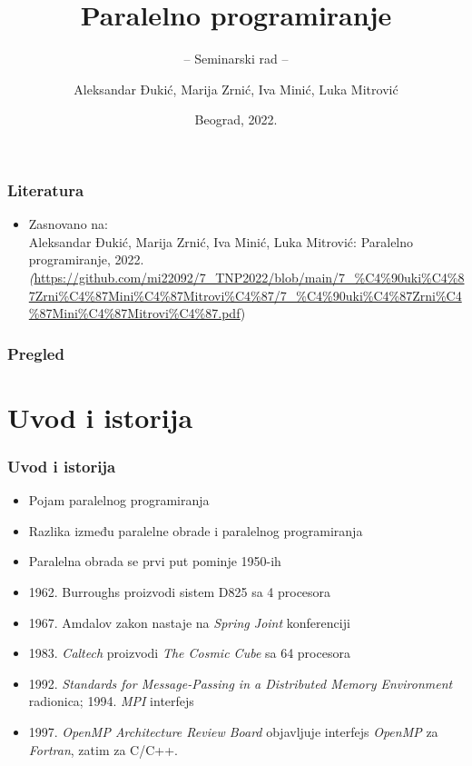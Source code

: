 \documentclass{beamer}
\title{Paralelno programiranje}
\subtitle{-- Seminarski rad --}
\author{Aleksandar Đukić, Marija Zrnić, Iva Minić, Luka Mitrović}
\institute{Matematički fakultet\\Univerzitet u Beogradu}
\date{
	\footnotesize{Beograd, 2022.}	
}
\begin{document}
	\begin{frame}
		\thispagestyle{empty}
		\titlepage
	\end{frame}
	
	\addtocounter{framenumber}{-1}
	
	\begin{frame}[fragile]\frametitle{Literatura}
		\begin{itemize}
			\item Zasnovano na:\\
			Aleksandar Đukić, Marija Zrnić, Iva Minić, Luka Mitrović: Paralelno programiranje, 2022.\\
			\emph(\url{https://github.com/mi22092/7_TNP2022/blob/main/7_%C4%90uki%C4%87Zrni%C4%87Mini%C4%87Mitrovi%C4%87/7_%C4%90uki%C4%87Zrni%C4%87Mini%C4%87Mitrovi%C4%87.pdf})
		\end{itemize}
	\end{frame}
	
	\begin{frame}
		\frametitle{Pregled}
		\tableofcontents[hidesubsections] 
	\end{frame}
	
	\section{Uvod i istorija}
	
	\begin{frame}[fragile]\frametitle{Uvod i istorija}
		\begin{itemize}	
			\item Pojam paralelnog programiranja
			\item Razlika između paralelne obrade i paralelnog programiranja
			\bigskip
			\item Paralelna obrada se prvi put pominje 1950-ih
			\item 1962. Burroughs proizvodi sistem D825 sa 4 procesora
			\item 1967. Amdalov zakon nastaje na \emph{Spring Joint} konferenciji
			\item 1983. \emph{Caltech} proizvodi \emph{The Cosmic Cube} sa 64 procesora
			\bigskip
			\item 1992. \emph{Standards for Message-Passing in a Distributed Memory Environment} radionica; 1994. \emph{MPI} interfejs
			\item 1997. \emph{OpenMP Architecture Review Board} objavljuje interfejs \emph{OpenMP} za \emph{Fortran}, zatim za C/C++.
		\end{itemize}
	\end{frame}
	
\end{document}
